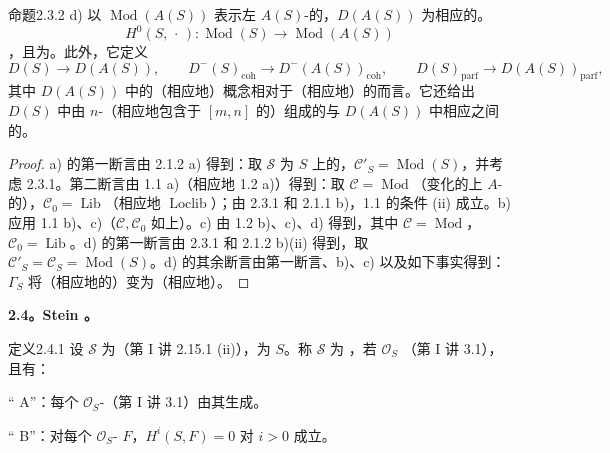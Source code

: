 \begin{SGAresult}{命题}{2.3.2}
d) 以 $\operatorname{Mod}(A(S))$ 表示左 $A(S)$-的，$D(A(S))$ 为相应的。
\[
H^0(S,\,\cdot\,):\operatorname{Mod}(S)\longrightarrow\operatorname{Mod}(A(S))
\]
，且为。此外，它定义
\[
D(S)\longrightarrow D(A(S)),\qquad
D^-(S)_{\mathrm{coh}}\longrightarrow D^-(A(S))_{\mathrm{coh}},\qquad
D(S)_{\mathrm{parf}}\longrightarrow D(A(S))_{\mathrm{parf}},
\]
其中 $D(A(S))$ 中的（相应地）概念相对于（相应地）的而言。它还给出 $D(S)$ 中由 $n$-（相应地包含于 $[m,n]$ 的）组成的与 $D(A(S))$ 中相应之间的。
\end{SGAresult}
\begin{proof}
a) 的第一断言由 2.1.2 a) 得到：取 $\mathcal S$ 为 $S$ 上的，$\mathcal C'_S=\operatorname{Mod}(S)$，并考虑 2.3.1。第二断言由 1.1 a)（相应地 1.2 a)）得到：取 $\mathcal C=\operatorname{Mod}$（变化的上 $A$-的），$\mathcal C_0=\operatorname{Lib}$（相应地 $\operatorname{Loclib}$）；由 2.3.1 和 2.1.1 b)，1.1 的条件 (ii) 成立。b) 应用 1.1 b)、c)（$\mathcal C,\mathcal C_0$ 如上）。c) 由 1.2 b)、c)、d) 得到，其中 $\mathcal C=\operatorname{Mod}$，$\mathcal C_0=\operatorname{Lib}$。d) 的第一断言由 2.3.1 和 2.1.2 b)(ii) 得到，取 $\mathcal C'_S=\mathcal C_S=\operatorname{Mod}(S)$。d) 的其余断言由第一断言、b)、c) 以及如下事实得到：$\Gamma_S$ 将（相应地的）变为（相应地）。
\end{proof}
\textbf{2.4。Stein 。}
\begin{SGAresult}{定义}{2.4.1}
设 $\mathcal S$ 为（第 I 讲 2.15.1 (ii)），为 $S$。称 $\mathcal S$ 为 ，若 $\mathcal O_S$ （第 I 讲 3.1），且有：

“ A”：每个 $\mathcal O_S$-（第 I 讲 3.1）由其生成。

“ B”：对每个 $\mathcal O_S$- $F$，$H^i(S,F)=0$ 对 $i>0$ 成立。
\end{SGAresult}
